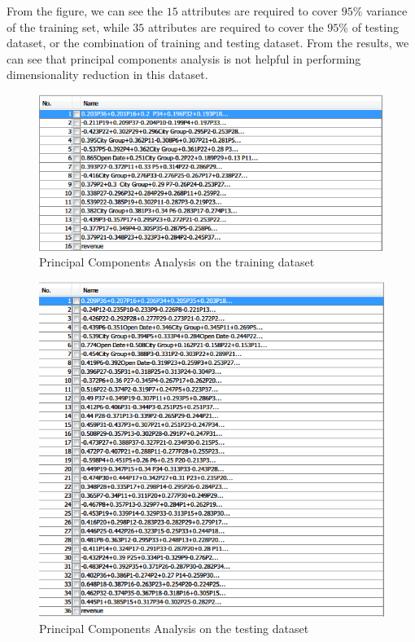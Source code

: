 \documentclass[10pt, oneside]{article}   	%
\begin{document}
From the figure, we can see the $15$ attributes are required to cover $95\%$ variance of the training set, while $35$ attributes are required to cover the $95\%$ of testing dataset, or the combination of training and testing dataset. From the results, we can see that principal components analysis is not helpful in performing dimensionality reduction in this dataset.

\begin{figure}[h] %
   \centering
   \includegraphics[width=5in]{figs/pca_seperate.PNG} 
   \caption{Principal Components Analysis on the training dataset}
   \label{fig:pca_train}
\end{figure}

\begin{figure}[h] %
   \centering
   \includegraphics[width=5in]{figs/pca_test.PNG} 
   \caption{Principal Components Analysis on the testing dataset}
   \label{fig:pca_test}
\end{figure}
\end{document}
